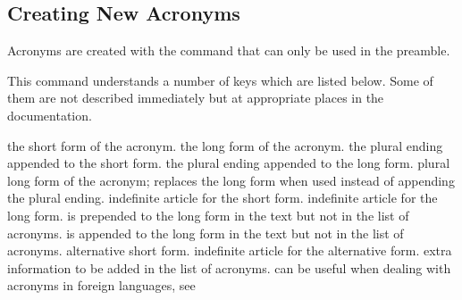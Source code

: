 \documentclass[DIV10,toc=index,toc=bib,hyperfootnotes=false]{cnpkgdoc}
\makeatletter
\providecommand*\sinceversion[1]{%
  \@bsphack
  \marginnote{%
    \footnotesize\sffamily\RaggedRight
    \textcolor{black!75}{Introduced in version~#1}}%
  \@esphack}
\providecommand*\changedversion[1]{%
  \@bsphack
  \marginnote{%
    \footnotesize\sffamily\RaggedRight
    \textcolor{black!75}{Changed in version~#1}}%
  \@esphack}
\makeatother
\begin{document}
\subsection{Creating New Acronyms}
\noindent\changedversion{1.0}Acronyms are created with the command
 that can only be used in the preamble.
\begin{beschreibung}
\end{beschreibung}
This command understands a number of keys which are listed below. Some of them
are not described immediately but at appropriate places in the documentation.
\begin{beschreibung}
 \newline
   the short form of the acronym.
 \newline
   the long form of the acronym.
   the plural ending appended to the short form.
   the plural ending appended to the long form.
 \newline
   plural long form of the acronym; replaces the long form when used instead of
   appending the plural ending.
   \sinceversion{1.2}%
   indefinite article for the short form.
   \sinceversion{1.2}%
   indefinite article for the long form.
 \newline
   \sinceversion{1.1} is prepended to the long form in the text but
   not in the list of acronyms.
 \newline
   \sinceversion{1.1} is appended to the long form in the text but
   not in the list of acronyms.
 \newline
   alternative short form.
   \sinceversion{1.2}%
   indefinite article for the alternative form.
 \newline
   extra information to be added in the list of acronyms.
 \newline
   \sinceversion{1.3}%
   can be useful when dealing with acronyms in foreign languages, see

\end{beschreibung}
\end{document}
